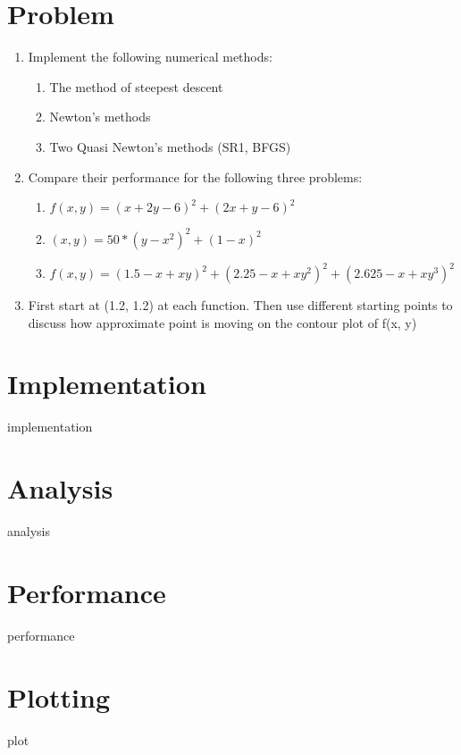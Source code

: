 \documentclass[12pt,letterpaper]{article}
\begin{document}
\section*{Problem}

\begin{enumerate}
  \item Implement the following numerical methods:
  \begin{enumerate}
    \item The method of steepest descent
    \item Newton's methods
    \item Two Quasi Newton's methods (SR1, BFGS)
  \end{enumerate}
  \item Compare their performance for the following three problems:
  \begin{enumerate}
    \item $f(x, y)=(x+2y-6)^2 + (2x+y-6)^2$
    \item $(x, y)=50*(y-x^2)^2 + (1-x)^2$
    \item $f(x, y)=(1.5-x+xy)^2 + (2.25-x+xy^2)^2 + (2.625 - x+ xy^3)^2$
  \end{enumerate}
  \item First start at (1.2, 1.2) at each function. 
  Then use different starting points to discuss how approximate point is moving on the contour plot of f(x, y)
\end{enumerate}

\section*{Implementation}
{implementation}

\newpage
\section*{Analysis}
{analysis}

\newpage
\section*{Performance}
{performance}

\newpage
\section*{Plotting}
{plot}
\end{document}
